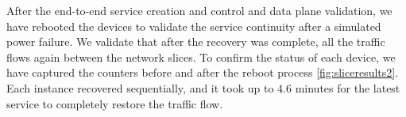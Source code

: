 \documentclass[journal,article,submit,moreauthors,pdftex]{Definitions/mdpi}
\begin{document}
After the end-to-end service creation and control and data plane validation, we have rebooted the devices to validate the service continuity after a simulated power failure. We validate that after the recovery was complete, all the traffic flows again between the network slices. To confirm the status of each device, we have captured the counters before and after the reboot process \cref{fig:sliceresults2}.  Each instance recovered sequentially, and it took up to $4.6$ minutes for the latest service to completely restore the traffic flow. 





\end{document}
